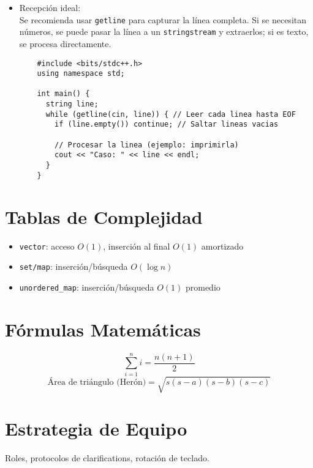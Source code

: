 \documentclass[11pt,a4paper]{article}
\begin{document}
\begin{enumerate} [label=\alph*.]
\begin{itemize}
    \item Recepción ideal:\\
          Se recomienda usar \texttt{getline} para capturar la línea completa. Si se necesitan números, se puede pasar la línea a un \texttt{stringstream} y extraerlos; si es texto, se procesa directamente.
    \begin{lstlisting}
    #include <bits/stdc++.h>
    using namespace std;

    int main() {
      string line;
      while (getline(cin, line)) { // Leer cada linea hasta EOF
        if (line.empty()) continue; // Saltar lineas vacias

        // Procesar la linea (ejemplo: imprimirla)
        cout << "Caso: " << line << endl;
      }
    }
    \end{lstlisting}
  \end{itemize}
\end{enumerate}


\section{Tablas de Complejidad}
\begin{itemize}
  \item \texttt{vector}: acceso $O(1)$, inserción al final $O(1)$ amortizado
  \item \texttt{set/map}: inserción/búsqueda $O(\log n)$
  \item \texttt{unordered\_map}: inserción/búsqueda $O(1)$ promedio
\end{itemize}

\section{Fórmulas Matemáticas}
\[
\sum_{i=1}^n i = \frac{n(n+1)}{2}
\]
\[
\text{Área de triángulo (Herón)} = \sqrt{s(s-a)(s-b)(s-c)}
\]

\section{Estrategia de Equipo}
Roles, protocolos de clarifications, rotación de teclado.
\end{document}
